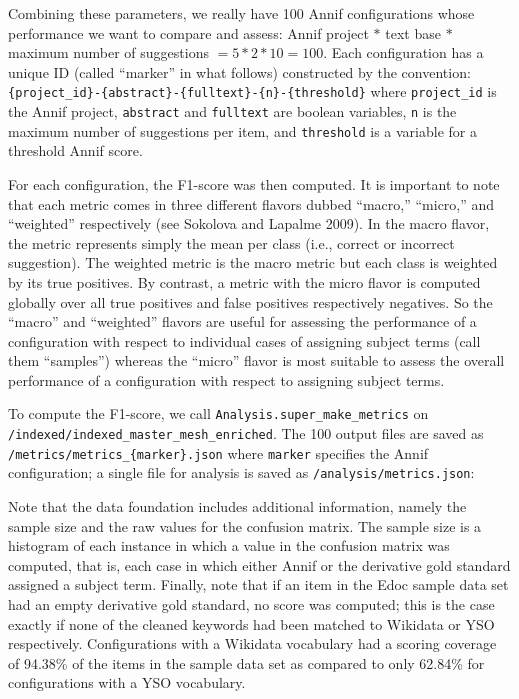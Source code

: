 Combining these parameters, we really have 100 Annif configurations
whose performance we want to compare and assess: Annif project \(*\)
text base \(*\) maximum number of suggestions \(= 5 * 2 * 10 = 100\).
Each configuration has a unique ID (called ``marker'' in what follows)
constructed by the convention:
\texttt{\{project\_id\}-\{abstract\}-\{fulltext\}-\{n\}-\{threshold\}}
where \texttt{project\_id} is the Annif project, \texttt{abstract} and
\texttt{fulltext} are boolean variables, \texttt{n} is the maximum
number of suggestions per item, and \texttt{threshold} is a variable for
a threshold Annif score.

For each configuration, the F1-score was then computed. It is important
to note that each metric comes in three different flavors dubbed
``macro,'' ``micro,'' and ``weighted'' respectively (see Sokolova and
Lapalme 2009). In the macro flavor, the metric represents simply the
mean per class (i.e., correct or incorrect suggestion). The weighted
metric is the macro metric but each class is weighted by its true
positives. By contrast, a metric with the micro flavor is computed
globally over all true positives and false positives respectively
negatives. So the ``macro'' and ``weighted'' flavors are useful for
assessing the performance of a configuration with respect to individual
cases of assigning subject terms (call them ``samples'') whereas the
``micro'' flavor is most suitable to assess the overall performance of a
configuration with respect to assigning subject terms.

To compute the F1-score, we call \texttt{Analysis.super\_make\_metrics}
on \texttt{/indexed/indexed\_master\_mesh\_enriched}. The 100 output
files are saved as \texttt{/metrics/metrics\_\{marker\}.json} where
\texttt{marker} specifies the Annif configuration; a single file for
analysis is saved as \texttt{/analysis/metrics.json}:

\begin{Shaded}
\begin{Highlighting}[]
\OperatorTok{+} \NormalTok{)}
\end{Highlighting}
\end{Shaded}

Note that the data foundation includes additional information, namely
the sample size and the raw values for the confusion matrix. The sample
size is a histogram of each instance in which a value in the confusion
matrix was computed, that is, each case in which either Annif or the
derivative gold standard assigned a subject term. Finally, note that if
an item in the Edoc sample data set had an empty derivative gold
standard, no score was computed; this is the case exactly if none of the
cleaned keywords had been matched to Wikidata or YSO respectively.
Configurations with a Wikidata vocabulary had a scoring coverage of
94.38\% of the items in the sample data set as compared to only 62.84\%
for configurations with a YSO vocabulary.

